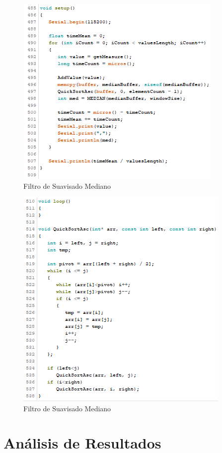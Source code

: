 \documentclass[10pt,a4paper]{article}
\begin{document}
\begin{multicols}{2}
\begin{itemize}
\begin{figure}[H]
\centering
\includegraphics[scale=0.85]{codianotres.PNG}
\caption{Filtro de Suavisado Mediano}
\end{figure}

\begin{figure}[H]
\centering
\includegraphics[scale=0.85]{coddianocuatro.PNG}
\caption{Filtro de Suavisado Mediano}
\end{figure}


\section{Análisis de Resultados}


\end{itemize}
\end{multicols}
\end{document}
